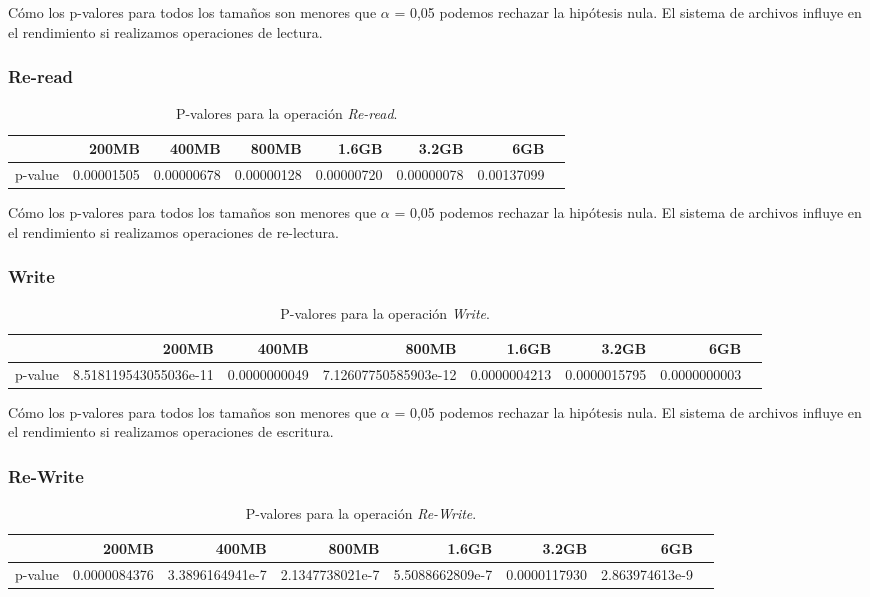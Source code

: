 Cómo los p-valores para todos los tamaños son menores que $\alpha$ = 0,05 podemos rechazar la hipótesis nula. El sistema de archivos influye en el rendimiento si realizamos operaciones de lectura. 

\subsubsection{Re-read}
\begin{table}[!htp]\centering
\scriptsize
\begin{tabular}{lrrrrrrr}\toprule
&200MB &400MB &800MB &1.6GB &3.2GB &6GB \\\midrule
p-value &0.00001505 &0.00000678 &0.00000128 &0.00000720 &0.00000078 &0.00137099 \\
\bottomrule
\end{tabular}
\caption{P-valores para la operación \textit{Re-read}.}\label{tab: }
\end{table}

Cómo los p-valores para todos los tamaños son menores que $\alpha$ = 0,05 podemos rechazar la hipótesis nula. El sistema de archivos influye en el rendimiento si realizamos operaciones de re-lectura. 


\subsubsection{Write}
\begin{table}[!htp]\centering
\scriptsize
\begin{tabular}{lrrrrrrr}\toprule
&200MB &400MB &800MB &1.6GB &3.2GB &6GB \\\midrule
p-value &8.518119543055036e-11 &0.0000000049 &7.12607750585903e-12 &0.0000004213 &0.0000015795 &0.0000000003 \\
\bottomrule
\end{tabular}
\caption{P-valores para la operación \textit{Write}.}\label{tab: }
\end{table}

Cómo los p-valores para todos los tamaños son menores que $\alpha$ = 0,05 podemos rechazar la hipótesis nula. El sistema de archivos influye en el rendimiento si realizamos operaciones de escritura. 
 \newpage
\subsubsection{Re-Write}
\begin{table}[!htp]\centering
\scriptsize
\begin{tabular}{lrrrrrrr}\toprule
&200MB &400MB &800MB &1.6GB &3.2GB &6GB \\\midrule
p-value &0.0000084376 &3.3896164941e-7 &2.1347738021e-7 &5.5088662809e-7 &0.0000117930 &2.863974613e-9 \\
\bottomrule
\end{tabular}
\caption{P-valores para la operación \textit{Re-Write}.}\label{tab: }
\end{table}

